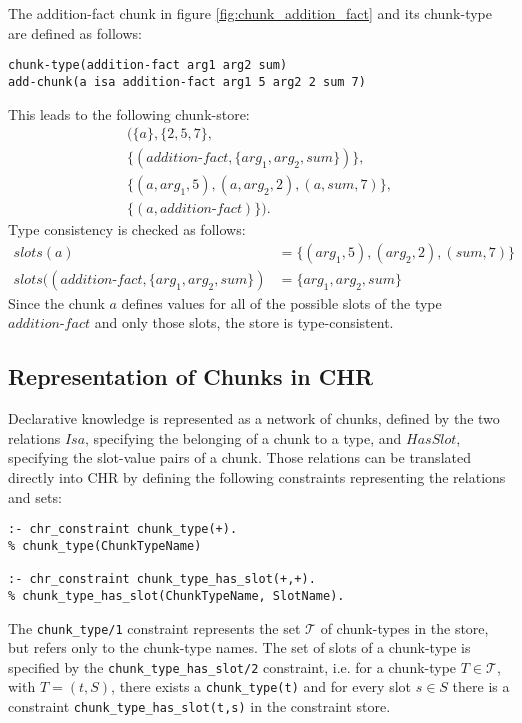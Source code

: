 \begin{example}
 \label{ex:addition_fact_formal}
 The addition-fact chunk in figure \ref{fig:chunk_addition_fact} and its chunk-type are defined as follows:
 
\begin{lstlisting}
chunk-type(addition-fact arg1 arg2 sum)
add-chunk(a isa addition-fact arg1 5 arg2 2 sum 7)
\end{lstlisting}
 
 This leads to the following chunk-store: 
 \begin{align*}
 (\{a\}, \{2, 5, 7\},\\ 
 \{(addition\mbox{-}fact, \{arg_1, arg_2, sum\})\},\\
 \{(a, arg_1, 5), (a, arg_2, 2), (a, sum, 7)\},\\
 \{(a, addition\mbox{-}fact)\}).
 \end{align*}
 Type consistency is checked as follows:
 \begin{align*}
 slots(a) &= \{(arg_1, 5), (arg_2, 2), (sum, 7)\}\\
 slots((addition\mbox{-}fact,\{arg_1, arg_2, sum\}) &= \{arg_1, arg_2, sum\}
 \end{align*}
 Since the chunk $a$ defines values for all of the possible slots of the type $addition\mbox{-}fact$ and only those slots, the store is type-consistent.
\end{example}

\subsection{Representation of Chunks in CHR}

Declarative knowledge is represented as a network of chunks, defined by the two relations $Isa$, specifying the belonging of a chunk to a type, and $HasSlot$, specifying the slot-value pairs of a chunk. Those relations can be translated directly into CHR by defining the following constraints representing the relations and sets:

\begin{lstlisting}
:- chr_constraint chunk_type(+).
% chunk_type(ChunkTypeName)

:- chr_constraint chunk_type_has_slot(+,+).
% chunk_type_has_slot(ChunkTypeName, SlotName).
\end{lstlisting}

The \lstinline|chunk_type/1| constraint represents the set $\mathcal{T}$ of chunk-types in the store, but refers only to the chunk-type names. The set of slots of a chunk-type is specified by the \lstinline|chunk_type_has_slot/2| constraint, i.e. for a chunk-type $T \in \mathcal{T}$, with $T = (t, S)$, there exists a \texttt{chunk\_type(t)} and for every slot $s \in S$ there is a constraint \lstinline|chunk_type_has_slot(t,s)| in the constraint store.

